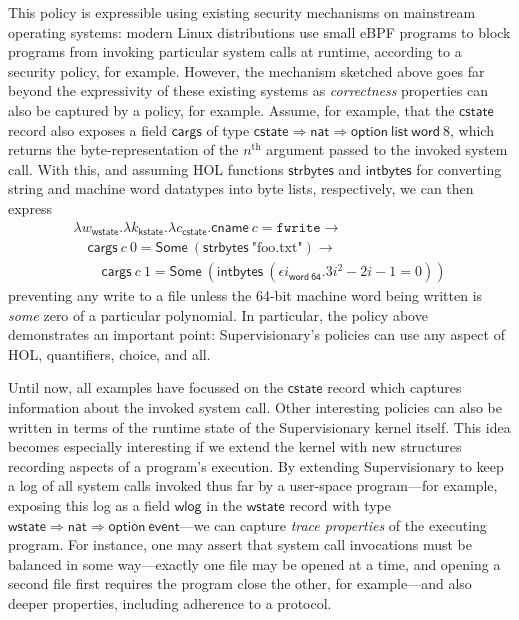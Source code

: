 \documentclass[a4paper, UKenglish, cleveref, autoref, thm-restate, colorlinks]{lipics-v2021}
\newcommand{\eps}[1]{\epsilon{#1}.}
\newcommand{\lam}[1]{\lambda{#1}.}
\begin{document}
This policy is expressible using existing security mechanisms on mainstream operating systems: modern Linux distributions use small eBPF programs to block programs from invoking particular system calls at runtime, according to a security policy, for example.
However, the mechanism sketched above goes far beyond the expressivity of these existing systems as \emph{correctness} properties can also be captured by a policy, for example.
Assume, for example, that the $\mathsf{cstate}$ record also exposes a field $\mathsf{cargs}$ of type $\mathsf{cstate} \Rightarrow \mathsf{nat} \Rightarrow \mathsf{option}\ \mathsf{list}\ \mathsf{word}\ 8$, which returns the byte-representation of the $n^\mathrm{th}$ argument passed to the invoked system call.
With this, and assuming HOL functions $\mathsf{strbytes}$ and $\mathsf{intbytes}$ for converting string and machine word datatypes into byte lists, respectively, we can then express
\begin{gather*}
\lam{w_{\mathsf{wstate}}}\lam{k_{\mathsf{kstate}}}\lam{c_{\mathsf{cstate}}}\mathsf{cname}\ c = \mathtt{fwrite} \longrightarrow \\
\quad\mathsf{cargs}\ c\ 0 = \mathsf{Some}\ (\mathsf{strbytes}\ \text{"foo.txt"}) \longrightarrow \\
\qquad\mathsf{cargs}\ c\ 1 = \mathsf{Some}\ (\mathsf{intbytes}\ (\eps{i_\mathsf{word\ 64}}3i^2 - 2i - 1 = 0))
\end{gather*}
preventing any write to a file unless the 64-bit machine word being written is \emph{some} zero of a particular polynomial.
In particular, the policy above demonstrates an important point: Supervisionary's policies can use any aspect of HOL, quantifiers, choice, and all.

Until now, all examples have focussed on the $\mathsf{cstate}$ record which captures information about the invoked system call.
Other interesting policies can also be written in terms of the runtime state of the Supervisionary kernel itself.
This idea becomes especially interesting if we extend the kernel with new structures recording aspects of a program's execution.
By extending Supervisionary to keep a log of all system calls invoked thus far by a user-space program---for example, exposing this log as a field $\mathsf{wlog}$ in the $\mathsf{wstate}$ record with type $\mathsf{wstate} \Rightarrow \mathsf{nat} \Rightarrow \mathsf{option}\ \mathsf{event}$---we can capture \emph{trace properties} of the executing program.
For instance, one may assert that system call invocations must be balanced in some way---exactly one file may be opened at a time, and opening a second file first requires the program close the other, for example---and also deeper properties, including adherence to a protocol.
\end{document}
